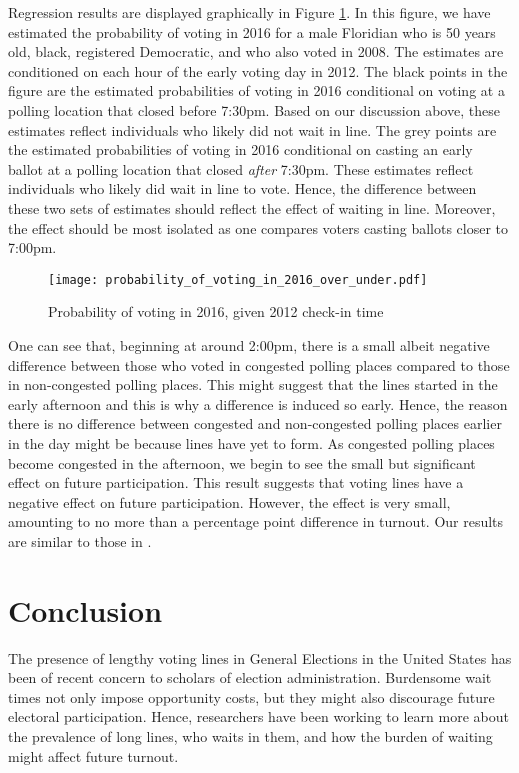 \documentclass[12pt,titlepage]{article}
\begin{document}
Regression results are displayed graphically in Figure
\ref{fig:prvoting2016}. In this figure, we have estimated the
probability of voting in 2016 for a male Floridian who is 50 years
old, black, registered Democratic, and who also voted in 2008.  The
estimates are conditioned on each hour of the early voting day in
2012. The black points in the figure are the estimated probabilities
of voting in 2016 conditional on voting at a polling location that
closed before 7:30pm.  Based on our discussion above, these estimates
reflect individuals who likely did not wait in line.  The grey points
are the estimated probabilities of voting in 2016 conditional on
casting an early ballot at a polling location that closed \emph{after}
7:30pm.  These estimates reflect individuals who likely did wait in
line to vote.  Hence, the difference between these two sets of
estimates should reflect the effect of waiting in line.  Moreover, the
effect should be most isolated as one compares voters casting ballots
closer to 7:00pm.

\begin{figure}[!ht]
\caption{Probability of voting in 2016, given 2012 check-in time}
  \label{fig:prvoting2016}
  \centering
    \centering\texttt{[image: probability\_of\_voting\_in\_2016\_over\_under.pdf]}
\end{figure}

One can see that, beginning at around 2:00pm, there is a small albeit
negative difference between those who voted in congested polling
places compared to those in non-congested polling places.  This might
suggest that the lines started in the early afternoon and this is why
a difference is induced so early.  Hence, the reason there is no
difference between congested and non-congested polling places earlier
in the day might be because lines have yet to form. As congested
polling places become congested in the afternoon, we begin to see the
small but significant effect on future participation.  This result
suggests that voting lines have a negative effect on future
participation.  However, the effect is very small, amounting to no
more than a percentage point difference in turnout.  Our results are
similar to those in \citet{pettigrew:longlinesminorityprecincts}.

\section*{Conclusion}

The presence of lengthy voting lines in General Elections in the
United States has been of recent concern to scholars of election
administration. Burdensome wait times not only impose opportunity
costs, but they might also discourage future electoral participation.
Hence, researchers have been working to learn more about the
prevalence of long lines, who waits in them, and how the burden of
waiting might affect future turnout.
\end{document}
